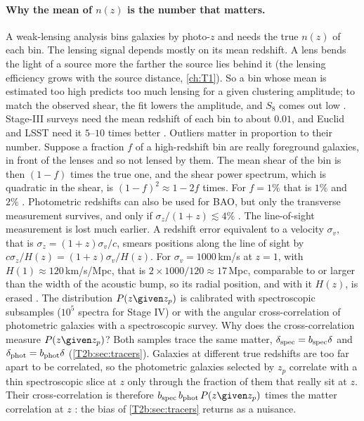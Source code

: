 \paragraph{Why the mean of $n(z)$ is the number that matters.} A weak-lensing analysis bins galaxies by photo-$z$ and needs the true $n(z)$ of each bin. The lensing signal depends mostly on its mean redshift. A lens bends the light of a source more the farther the source lies behind it (the lensing efficiency grows with the source distance, \cref{ch:T1}). So a bin whose mean is estimated too high predicts too much lensing for a given clustering amplitude; to match the observed shear, the fit lowers the amplitude, and $S_8$ comes out low . Stage-III surveys need the mean redshift of each bin to about $0.01$, and Euclid and LSST need it $5$--$10$ times better \cite[Sec.~V.B.2]{Abdalla2022}. Outliers matter in proportion to their number. Suppose a fraction $f$ of a high-redshift bin are really foreground galaxies, in front of the lenses and so not lensed by them. The mean shear of the bin is then $(1-f)$ times the true one, and the shear power spectrum, which is quadratic in the shear, is $(1-f)^2\approx1-2f$ times. For $f=1\%$ that is $1\%$ and $2\%$ \cite[p.~94]{Weinberg2013}. Photometric redshifts can also be used for BAO, but only the transverse measurement survives, and only if $\sigma_z/(1+z)\lesssim4\%$ \cite[pp.~62--63]{Weinberg2013}. The line-of-sight measurement is lost much earlier. A redshift error equivalent to a velocity $\sigma_v$, that is $\sigma_z=(1+z)\sigma_v/c$, smears positions along the line of sight by $c\sigma_z/H(z)=(1+z)\sigma_v/H(z)$. For $\sigma_v=1000$\,km/s at $z=1$, with $H(1)\approx120$\,km/s/Mpc, that is $2\times1000/120\approx17$\,Mpc, comparable to or larger than the width of the acoustic bump, so its radial position, and with it $H(z)$, is erased \cite[pp.~62--63]{Weinberg2013}. The distribution $P(z\given z_p)$ is calibrated with spectroscopic subsamples ($10^5$ spectra for Stage IV) or with the angular cross-correlation of photometric galaxies with a spectroscopic survey. Why does the cross-correlation measure $P(z\given z_p)$? Both samples trace the same matter, $\delta_{\rm spec}=b_{\rm spec}\delta$ and $\delta_{\rm phot}=b_{\rm phot}\delta$ (\cref{T2b:sec:tracers}). Galaxies at different true redshifts are too far apart to be correlated, so the photometric galaxies selected by $z_p$ correlate with a thin spectroscopic slice at $z$ only through the fraction of them that really sit at $z$. Their cross-correlation is therefore $b_{\rm spec}\,b_{\rm phot}\,P(z\given z_p)$ times the matter correlation at $z$ \cite[p.~97]{Weinberg2013}: the bias of \cref{T2b:sec:tracers} returns as a nuisance.

